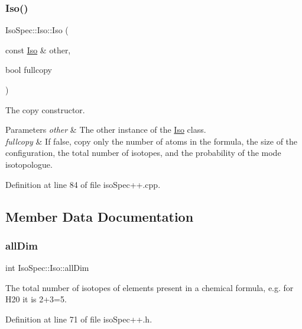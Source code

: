 \subsubsection{\texorpdfstring{Iso()}{Iso()}\hspace{0.1cm}{\footnotesize\ttfamily [2/2]}}
{\footnotesize\ttfamily Iso\+Spec\+::\+Iso\+::\+Iso (\begin{DoxyParamCaption}\item[{const \mbox{\hyperlink{class_iso_spec_1_1_iso}{Iso}} \&}]{other,  }\item[{bool}]{fullcopy }\end{DoxyParamCaption})}



The copy constructor. 


\begin{DoxyParams}{Parameters}
{\em other} & The other instance of the \mbox{\hyperlink{class_iso_spec_1_1_iso}{Iso}} class. \\
\hline
{\em fullcopy} & If false, copy only the number of atoms in the formula, the size of the configuration, the total number of isotopes, and the probability of the mode isotopologue. \\
\hline
\end{DoxyParams}


Definition at line 84 of file iso\+Spec++.\+cpp.



\subsection{Member Data Documentation}
\mbox{\label{class_iso_spec_1_1_iso_a8dd2c443706935b582979b13f935115c}} 
\subsubsection{\texorpdfstring{all\+Dim}{allDim}}
{\footnotesize\ttfamily int Iso\+Spec\+::\+Iso\+::all\+Dim\hspace{0.3cm}{\ttfamily [protected]}}

The total number of isotopes of elements present in a chemical formula, e.\+g. for H20 it is 2+3=5. 

Definition at line 71 of file iso\+Spec++.\+h.

\mbox{\label{class_iso_spec_1_1_iso_ab01939334b6c3e69f65a36f9965971a2}} 
